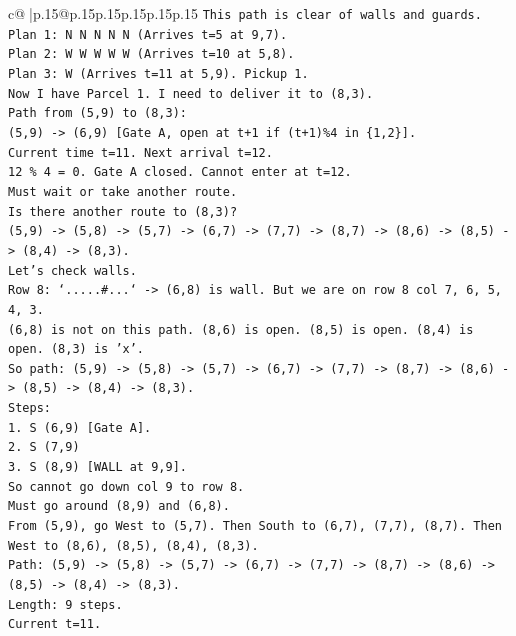 \documentclass{article}
\begin{document}
{\begin{supertabular}{c@{$\;$}|p{.15\linewidth}@{}p{.15\linewidth}p{.15\linewidth}p{.15\linewidth}p{.15\linewidth}p{.15\linewidth}}
{{{\texttt{This path is clear of walls and guards.} \\
\texttt{Plan 1: N N N N N (Arrives t=5 at 9,7).} \\
\texttt{Plan 2: W W W W W (Arrives t=10 at 5,8).} \\
\texttt{Plan 3: W (Arrives t=11 at 5,9). Pickup 1.} \\
\texttt{Now I have Parcel 1. I need to deliver it to (8,3).} \\
\texttt{Path from (5,9) to (8,3):} \\
\texttt{(5,9) {-}> (6,9) {[}Gate A, open at t+1 if (t+1)\%4 in \{1,2\}{]}.} \\
\texttt{Current time t=11. Next arrival t=12.} \\
\texttt{12 \% 4 = 0. Gate A closed. Cannot enter at t=12.} \\
\texttt{Must wait or take another route.} \\
\texttt{Is there another route to (8,3)?} \\
\texttt{(5,9) {-}> (5,8) {-}> (5,7) {-}> (6,7) {-}> (7,7) {-}> (8,7) {-}> (8,6) {-}> (8,5) {-}> (8,4) {-}> (8,3).} \\
\texttt{Let's check walls.} \\
\texttt{Row 8: `.....\#...` {-}> (6,8) is wall. But we are on row 8 col 7, 6, 5, 4, 3.} \\
\texttt{(6,8) is not on this path. (8,6) is open. (8,5) is open. (8,4) is open. (8,3) is 'x'.} \\
\texttt{So path: (5,9) {-}> (5,8) {-}> (5,7) {-}> (6,7) {-}> (7,7) {-}> (8,7) {-}> (8,6) {-}> (8,5) {-}> (8,4) {-}> (8,3).} \\
\texttt{Steps:} \\
\texttt{1. S (6,9) {[}Gate A{]}.} \\
\texttt{2. S (7,9)} \\
\texttt{3. S (8,9) {[}WALL at 9,9{]}.} \\
\texttt{So cannot go down col 9 to row 8.} \\
\texttt{Must go around (8,9) and (6,8).} \\
\texttt{From (5,9), go West to (5,7). Then South to (6,7), (7,7), (8,7). Then West to (8,6), (8,5), (8,4), (8,3).} \\
\texttt{Path: (5,9) {-}> (5,8) {-}> (5,7) {-}> (6,7) {-}> (7,7) {-}> (8,7) {-}> (8,6) {-}> (8,5) {-}> (8,4) {-}> (8,3).} \\
\texttt{Length: 9 steps.} \\
\texttt{Current t=11.} \\
}}}
\end{supertabular}}
\end{document}
